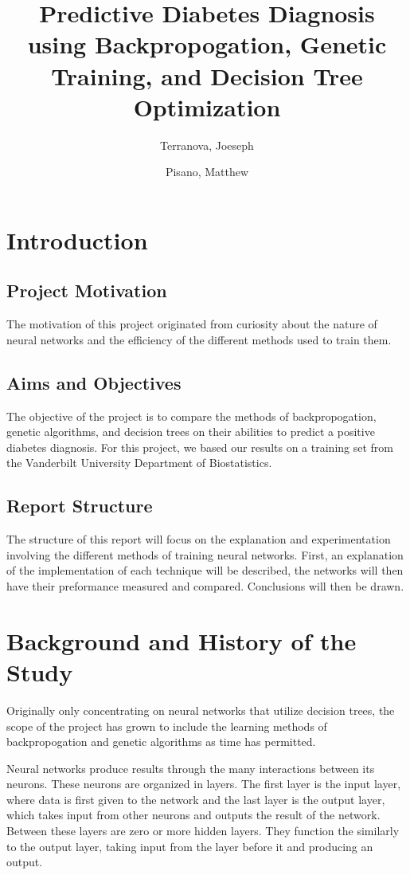 \documentclass[12pt]{article}
\title{\bf{Predictive Diabetes Diagnosis using Backpropogation, 
Genetic Training, and Decision Tree Optimization}}
\author{
    Terranova, Joeseph\\
    \and
    Pisano, Matthew\\
}
\date{\DTMusedate{date}}
\begin{document}
\maketitle

\section{Introduction}
    \subsection{Project Motivation}
        The motivation of this project originated from curiosity about the nature of neural 
        networks and the efficiency of the different methods used to train them.
    \subsection{Aims and Objectives}
        The objective of the project is to compare the methods of backpropogation, genetic 
        algorithms, and decision trees on their abilities to predict a positive diabetes diagnosis.  For
        this project, we based our results on a training set from the Vanderbilt University Department of Biostatistics.
    \subsection{Report Structure}
        The structure of this report will focus on the explanation and experimentation involving the
        different methods of training neural networks.  First, an explanation of the implementation of each technique
        will be described, the networks will then have their preformance measured and compared.  Conclusions will
        then be drawn.
\section{Background and History of the Study}
    Originally only concentrating on neural networks that utilize decision trees, 
    the scope of the project has grown to include the learning methods of backpropogation and 
    genetic algorithms as time has permitted.
    
    Neural networks produce results through the many interactions 
    between its neurons.  These neurons are organized in layers. The first layer is the input layer, 
    where data is first given to the network and the last layer is the output layer, which takes input 
    from other neurons and outputs the result of the network.  Between these layers are zero or more 
    hidden layers.  They function the similarly to the output layer, taking input from the layer before it 
    and producing an output.
    
\end{document}
